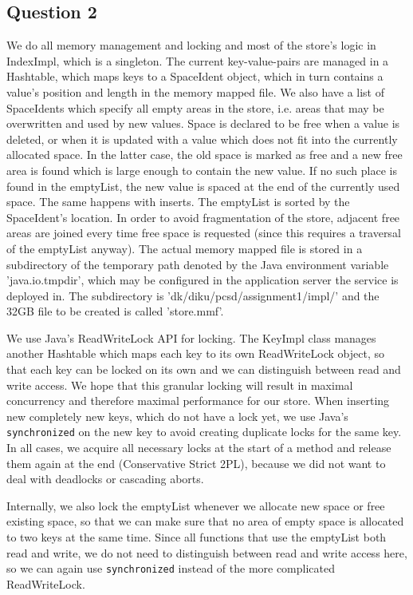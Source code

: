 \documentclass[12pt,a4paper]{article}
\begin{document}
\subsection*{Question 2}
\label{sec:pq2}

We do all memory management and locking and most of the store's logic in IndexImpl, which is a singleton. The current key-value-pairs are managed in a Hashtable, which maps keys to a SpaceIdent object, which in turn contains a value's position and length in the memory mapped file. We also have a list of SpaceIdents which specify all empty areas in the store, i.e. areas that may be overwritten and used by new values. Space is declared to be free when a value is deleted, or when it is updated with a value which does not fit into the currently allocated space. In the latter case, the old space is marked as free and a new free area is found which is large enough to contain the new value. If no such place is found in the emptyList, the new value is spaced at the end of the currently used space. The same happens with inserts. The emptyList is sorted by the SpaceIdent's location. In order to avoid fragmentation of the store, adjacent free areas are joined every time free space is requested (since this requires a traversal of the emptyList anyway). The actual memory mapped file is stored in a subdirectory of the temporary path denoted by the Java environment variable 'java.io.tmpdir', which may be configured in the application server the service is deployed in. The subdirectory is 'dk/diku/pcsd/assignment1/impl/' and the 32GB file to be created is called 'store.mmf'.

We use Java's ReadWriteLock API for locking. The KeyImpl class manages another Hashtable which maps each key to its own ReadWriteLock object, so that each key can be locked on its own and we can distinguish between read and write access. We hope that this granular locking will result in maximal concurrency and therefore maximal performance for our store. When inserting new completely new keys, which do not have a lock yet, we use Java's \texttt{synchronized} on the new key to avoid creating duplicate locks for the same key. In all cases, we acquire all necessary locks at the start of a method and release them again at the end (Conservative Strict 2PL), because we did not want to deal with deadlocks or cascading aborts. 

Internally, we also lock the emptyList whenever we allocate new space or free existing space, so that we can make sure that no area of empty space is allocated to two keys at the same time. Since all functions that use the emptyList both read and write, we do not need to distinguish between read and write access here, so we can again use \texttt{synchronized} instead of the more complicated ReadWriteLock.
\end{document}
